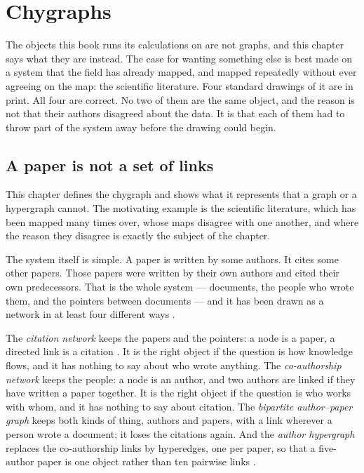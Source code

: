 \chapter{Chygraphs}
\label{ch:chygraphs}

The objects this book runs its calculations on are not graphs, and this chapter
says what they are instead. The case for wanting something else is best made on
a system that the field has already mapped, and mapped repeatedly without ever
agreeing on the map: the scientific literature. Four standard drawings of it are
in print. All four are correct. No two of them are the same object, and the
reason is not that their authors disagreed about the data. It is that each of
them had to throw part of the system away before the drawing could begin.

\section{A paper is not a set of links}
\label{sec:paper}

This chapter defines the chygraph and shows what it represents that a graph
or a hypergraph cannot. The motivating example is the scientific literature,
which has been mapped many times over, whose maps disagree with one another, and
where the reason they disagree is exactly the subject of the chapter.

The system itself is simple. A paper is written by some authors. It cites
some other papers. Those papers were written by their own authors and cited
their own predecessors. That is the whole system --- documents, the people who
wrote them, and the pointers between documents --- and it has been drawn as a
network in at least four different ways \citep{newman2001,barabasi2002}.

The \emph{citation network} keeps the papers and the pointers: a node is a
paper, a directed link is a citation \citep{redner1998}. It is the right object
if the question is how knowledge flows, and it has nothing to say about who
wrote anything. The \emph{co-authorship network} keeps the people: a node is an
author, and two authors are linked if they have written a paper together. It is
the right object if the question is who works with whom, and it has nothing to
say about citation. The \emph{bipartite author--paper graph} keeps both kinds of
thing, authors and papers, with a link wherever a person wrote a document; it
loses the citations again. And the \emph{author hypergraph} replaces the
co-authorship links by hyperedges, one per paper, so that a five-author paper is
one object rather than ten pairwise links \citep{vasilyeva2021}.

